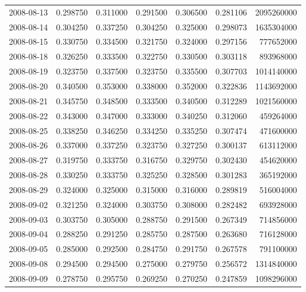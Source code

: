 \begin{tabular}{lrrrrrr}
2008-08-13 &    0.298750 &    0.311000 &    0.291500 &    0.306500 &    0.281106 &  2095260000 \\
2008-08-14 &    0.304250 &    0.337250 &    0.304250 &    0.325000 &    0.298073 &  1635304000 \\
2008-08-15 &    0.330750 &    0.334500 &    0.321750 &    0.324000 &    0.297156 &   777652000 \\
2008-08-18 &    0.326250 &    0.333500 &    0.322750 &    0.330500 &    0.303118 &   893968000 \\
2008-08-19 &    0.323750 &    0.337500 &    0.323750 &    0.335500 &    0.307703 &  1014140000 \\
2008-08-20 &    0.340500 &    0.353000 &    0.338000 &    0.352000 &    0.322836 &  1143692000 \\
2008-08-21 &    0.345750 &    0.348500 &    0.333500 &    0.340500 &    0.312289 &  1021560000 \\
2008-08-22 &    0.343000 &    0.347000 &    0.333000 &    0.340250 &    0.312060 &   459264000 \\
2008-08-25 &    0.338250 &    0.346250 &    0.334250 &    0.335250 &    0.307474 &   471600000 \\
2008-08-26 &    0.337000 &    0.337250 &    0.323750 &    0.327250 &    0.300137 &   613112000 \\
2008-08-27 &    0.319750 &    0.333750 &    0.316750 &    0.329750 &    0.302430 &   454620000 \\
2008-08-28 &    0.330250 &    0.333750 &    0.325250 &    0.328500 &    0.301283 &   365192000 \\
2008-08-29 &    0.324000 &    0.325000 &    0.315000 &    0.316000 &    0.289819 &   516004000 \\
2008-09-02 &    0.321250 &    0.324000 &    0.303750 &    0.308000 &    0.282482 &   693928000 \\
2008-09-03 &    0.303750 &    0.305000 &    0.288750 &    0.291500 &    0.267349 &   714856000 \\
2008-09-04 &    0.288250 &    0.291250 &    0.285750 &    0.287500 &    0.263680 &   716128000 \\
2008-09-05 &    0.285000 &    0.292500 &    0.284750 &    0.291750 &    0.267578 &   791100000 \\
2008-09-08 &    0.294500 &    0.294500 &    0.275000 &    0.279750 &    0.256572 &  1314840000 \\
2008-09-09 &    0.278750 &    0.295750 &    0.269250 &    0.270250 &    0.247859 &  1098296000 \\

\end{tabular}
